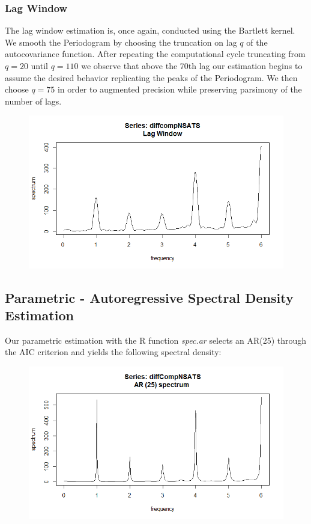 \documentclass[12pt]{article} %
\begin{document}
\subsubsection{Lag Window}

The lag window estimation is, once again, conducted using the Bartlett kernel. We smooth the Periodogram by choosing the truncation on lag $q$ of the autocovariance function. After repeating the computational cycle truncating from $q=20$ until $q=110$ we observe that above the 70th lag our estimation begins to assume the desired behavior replicating the peaks of the Periodogram. We then choose $q=75$ in order to augmented precision while preserving parsimony of the number of lags.


\begin{figure}[h!]
\begin{center}
\includegraphics[scale=0.5]{lagcompNSA}
\caption{}
\end{center}
\end{figure}


\subsection{Parametric - Autoregressive Spectral Density Estimation}

Our parametric estimation with the R function \emph{spec.ar} selects an AR(25) through the AIC criterion and yields the following spectral density:


\begin{figure}[h!]
\begin{center}
\includegraphics[scale=0.5]{specarcompNSA}
\caption{}
\end{center}
\end{figure}
\end{document}
